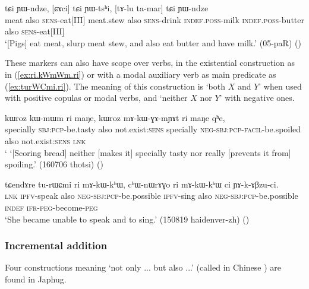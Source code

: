  \begin{exe}
\ex \label{ex:tCi.YWtshi.tCi.YWndze}
\gll [ɕa] tɕi ɲɯ-ndze, [ɕɤci] tɕi ɲɯ-tsʰi, [tɤ-lu ta-mar] tɕi ɲɯ-ndze  \\
meat also \textsc{sens}-eat[III] meat.stew also \textsc{sens}-drink  \textsc{indef}.\textsc{poss}-milk \textsc{indef}.\textsc{poss}-butter also \textsc{sens}-eat[III] \\
\glt  `[Pigs] eat meat, slurp meat stew, and also eat butter and have milk.' (05-paR)
()
\end{exe}

These markers can also have scope over verbs, in the existential construction as in (\ref{ex:ri.kWmWm.ri}) or with a modal auxiliary verb as main predicate as (\ref{ex:turWCmi.ri}). The meaning of this construction is `both $X$ and $Y$' when used with positive copulas or modal verbs, and `neither $X$ nor $Y$' with negative ones.  

 \begin{exe}
\ex \label{ex:ri.kWmWm.ri}
 \gll   kɯroz kɯ-mɯm ri maŋe, kɯroz mɤ-kɯ-ɣɤ-mɲɤt ri maŋe qʰe, \\
specially \textsc{sbj}:\textsc{pcp}-be.tasty also not.exist:\textsc{sens} specially \textsc{neg}-\textsc{sbj}:\textsc{pcp}-\textsc{facil}-be.spoiled also not.exist:\textsc{sens} \textsc{lnk} \\
 \glt ` `[Scoring bread] neither [makes it] specially tasty nor really [prevents it from] spoiling.'   (160706 thotsi)
 ()
  \end{exe}

 \begin{exe}
\ex \label{ex:turWCmi.ri}
 \gll   tɕendɤre tu-rɯɕmi ri mɤ-kɯ-kʰɯ, cʰɯ-nɯrɤɣo ri mɤ-kɯ-kʰɯ ci ɲɤ-k-ɤβzu-ci. \\
 \textsc{lnk} \textsc{ipfv}-speak also \textsc{neg}-\textsc{sbj}:\textsc{pcp}-be.possible  \textsc{ipfv}-sing also \textsc{neg}-\textsc{sbj}:\textsc{pcp}-be.possible  \textsc{indef} \textsc{ifr}-\textsc{peg}-become-\textsc{peg} \\
 \glt `She became unable to speak and to sing.' (150819 haidenver-zh)
()
 \end{exe}
 
\subsubsection{Incremental addition} \label{sec:incremental.addition}
Four constructions meaning `not only ... but also ...' (called in Chinese ) are found in Japhug.

